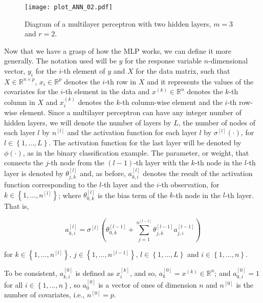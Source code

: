 \begin{figure}[H]
    \centering
    \texttt{[image: plot\_ANN\_02.pdf]}
    \caption{Diagram of a multilayer perceptron with two hidden layers, $m = 3$ and $r = 2$.}
    \label{fig:theory_ANN_diagram_02}
\end{figure}

Now that we have a grasp of how the MLP works, we can define it more generally. The notation used will be $y$ for the response variable $n$-dimensional vector, $y_i$ for the $i$-th element of $y$ and $X$ for the data matrix, such that $X \in \mathbb{R}^{n \times p}$, $x_i \in \mathbb{R}^p$ denotes the $i$-th row in $X$ and it represents the values of the covariates for the $i$-th element in the data and $x^{(k)} \in \mathbb{R}^n$ denotes the $k$-th column in $X$ and $x_i^{(k)}$ denotes the $k$-th column-wise element and the $i$-th row-wise element. Since a multilayer perceptron can have any integer number of hidden layers, we will denote the number of layers by $L$, the number of nodes of each layer $l$ by $n^{[l]}$ and the activation function for each layer $l$ by $\sigma^{[l]}(\cdot)$, for $l \in \left\{ 1, \ldots, L \right\}$. The activation function for the last layer will be denoted by $\phi(\cdot)$, as in the binary classification example. The parameter, or weight, that connects the $j$-th node from the $(l-1)$-th layer with the $k$-th node in the $l$-th layer is denoted by $\theta_{j,k}^{[l]}$ and, as before, $a_{k,i}^{[l]}$ denotes the result of the activation function corresponding to the $l$-th layer and the $i$-th observation, for $k \in \left\{ 1, \ldots, n^{[l]} \right\}$; where $\theta_{0,k}^{[l]}$ is the bias term of the $k$-th node in the $l$-th layer. That is,

\begin{equation}
  \label{eq:ann_act_funct_def}
  a_{k,i}^{[l]} = \sigma^{[l]} \left( \theta_{0,k}^{[l-1]} + \sum_{j = 1}^{n^{[l-1]}} \theta_{j,k}^{[l-1]} a_{j,i}^{[l-1]} \right)
\end{equation}

for $k \in \left\{ 1, \ldots, n^{[l]} \right\}$, $j \in \left\{ 1, \ldots, n^{[l-1]} \right\}$, $l \in \left\{ 1, \ldots, L \right\}$ and $i \in \left\{ 1, \ldots, n \right\}$.

To be consistent, $a_{k,i}^{[0]}$ is defined as $x_i^{[k]}$, and so, $a_{k}^{[0]} = x^{(k)} \in \mathbb{R}^n$; and $a_{0,i}^{[0]} = 1$ for all $i \in \left\{ 1, \ldots, n \right\}$, so $a_{0}^{[0]}$ is a vector of ones of dimension $n$ and $n^{[0]}$ is the number of covariates, i.e., $n^{[0]} = p$.

